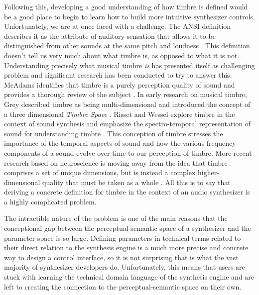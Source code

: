 Following this, developing a good understanding of how timbre is defined would be a good place to begin to learn how to build more intuitive synthesizer controls. Unfortunately, we are at once faced with a challenge. The ANSI definition describes it as the attribute of auditory sensation that allows it to be distinguished from other sounds at the same pitch and loudness \cite{american1973american}. This definition doesn't tell us very much about what timbre is, as opposed to what it is not. Understanding precisely what musical timbre \textit{is} has presented itself as challenging problem \cite{krumhansl1989musical} and significant research has been conducted to try to answer this. McAdams identifies that timbre is a purely perception quality of sound and provides a thorough review of the subject \cite{mcadams2019}. In early research on musical timbre, Grey described timbre as being multi-dimensional and introduced the concept of a three dimensional \textit{Timbre Space} \cite{grey1977multidimensional}. Risset and Wessel explore timbre in the context of sound synthesis and emphasize the spectro-temporal representation of sound for understanding timbre \cite{risset1999exploration}. This conception of timbre stresses the importance of the temporal aspects of sound and how the various frequency components of a sound evolve over time to our perception of timbre. More recent research based on neuroscience is moving away from the idea that timbre comprises a set of unique dimensions, but is instead a complex higher-dimensional quality that must be taken as a whole \cite{mcadams2019}. All this is to say that deriving a concrete definition for timbre in the context of an audio synthesizer is a highly complicated problem. 

The intractible nature of the problem is one of the main reasons that the conceptional gap between the perceptual-semantic space of a synthesizer and the parameter space is so large. Defining parameters in technical terms related to their direct relation to the synthesis engine is a much more precise and concrete way to design a control interface, so it is not surprising that is what the vast majority of synthesizer developers do. Unfortunately, this means that users are stuck with learning the technical domain language of the synthesis engine and are left to creating the connection to the perceptual-semantic space on their own.

